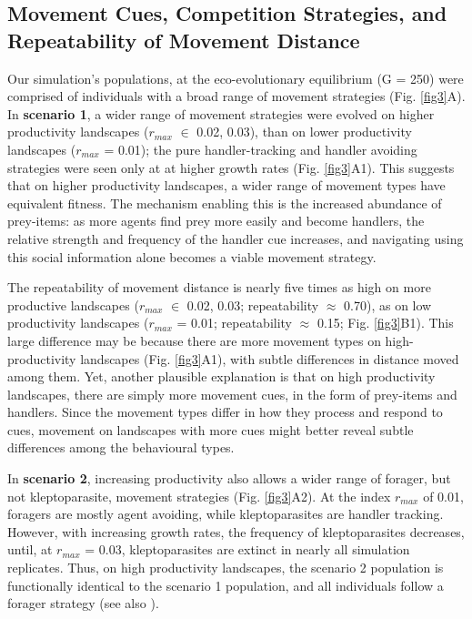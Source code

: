     \subsection*{Movement Cues, Competition Strategies, and Repeatability of Movement Distance}
    
    Our simulation's populations, at the eco-evolutionary equilibrium (G = 250) were comprised of individuals with a broad range of movement strategies (Fig. \ref{fig3}A).
    In \textbf{scenario 1}, a wider range of movement strategies were evolved on higher productivity landscapes ($r_{max}$ $\in$ 0.02, 0.03), than on lower productivity landscapes ($r_{max}$ = 0.01); the pure handler-tracking and handler avoiding strategies were seen only at at higher growth rates (Fig. \ref{fig3}A1).
    This suggests that on higher productivity landscapes, a wider range of movement types have equivalent fitness.
    The mechanism enabling this is the increased abundance of prey-items: as more agents find prey more easily and become handlers, the relative strength and frequency of the handler cue increases, and navigating using this social information alone becomes a viable movement strategy.
    
    The repeatability of movement distance is nearly five times as high on more productive landscapes ($r_{max}$ $\in$ 0.02, 0.03; repeatability $\approx$ 0.70), as on low productivity landscapes ($r_{max}$ = 0.01; repeatability $\approx$ 0.15; Fig. \ref{fig3}B1).
    This large difference may be because there are more movement types on high-productivity landscapes (Fig. \ref{fig3}A1), with subtle differences in distance moved among them.
    Yet, another plausible explanation is that on high productivity landscapes, there are simply more movement cues, in the form of prey-items and handlers.
    Since the movement types differ in how they process and respond to cues, movement on landscapes with more cues might better reveal subtle differences among the behavioural types.
    
    In \textbf{scenario 2}, increasing productivity also allows a wider range of forager, but not kleptoparasite, movement strategies (Fig. \ref{fig3}A2).
    At the index $r_{max}$ of 0.01, foragers are mostly agent avoiding, while kleptoparasites are handler tracking.
    However, with increasing growth rates, the frequency of kleptoparasites decreases, until, at $r_{max}$ = 0.03, kleptoparasites are extinct in nearly all simulation replicates.
    Thus, on high productivity landscapes, the scenario 2 population is functionally identical to the scenario 1 population, and all individuals follow a forager strategy (see also \citealt{gupte2021a}).
    
